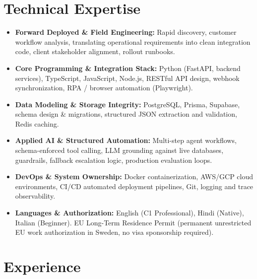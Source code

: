 \documentclass[10pt,a4paper]{article}
\begin{document}
\section{Technical Expertise}
\begin{itemize}
  \item \textbf{Forward Deployed \&  Field Engineering:} Rapid discovery, customer workflow analysis, translating operational requirements into clean integration code, client stakeholder alignment, rollout runbooks.
  \item \textbf{Core Programming \&  Integration Stack:} Python (FastAPI, backend services), TypeScript, JavaScript, Node.js, RESTful API design, webhook synchronization, RPA / browser automation (Playwright).
  \item \textbf{Data Modeling \&  Storage Integrity:} PostgreSQL, Prisma, Supabase, schema design \&  migrations, structured JSON extraction and validation, Redis caching.
  \item \textbf{Applied AI \&  Structured Automation:} Multi-step agent workflows, schema-enforced tool calling, LLM grounding against live databases, guardrails, fallback escalation logic, production evaluation loops.
  \item \textbf{DevOps \&  System Ownership:} Docker containerization, AWS/GCP cloud environments, CI/CD automated deployment pipelines, Git, logging and trace observability.
  \item \textbf{Languages \&  Authorization:} English (C1 Professional), Hindi (Native), Italian (Beginner). EU Long-Term Residence Permit (permanent unrestricted EU work authorization in Sweden, no visa sponsorship required).
\end{itemize}

\section{Experience}
\end{document}
